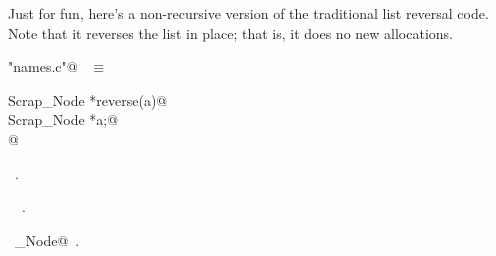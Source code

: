 \documentclass{report}
\begin{document}
Just for fun, here's a non-recursive version of the traditional list
reversal code. Note that it reverses the list in place; that is, it
does no new allocations.
\begin{flushleft} \small
\begin{minipage}{\linewidth} \label{scrap212}
\verb@"names.c"@\nobreak\ {\footnotesize {} }$\equiv$
\vspace{-1ex}
\begin{list}{}{} \item
\mbox{}\verb@static Scrap_Node *reverse(a)@\\
\mbox{}\verb@     Scrap_Node *a;@\\
\mbox{}@\\
\mbox{}\verb@@{\NWsep}
\end{list}
\vspace{-1ex}
\footnotesize\addtolength{\baselineskip}{-1ex}
\begin{list}{}{\setlength{\itemsep}{-\parsep}\setlength{\itemindent}{-\leftmargin}}
\item \NWtxtFileDefBy\ .
\end{list}
\vspace{-2ex}
\footnotesize\addtolength{\baselineskip}{-1ex}
\begin{list}{}{\setlength{\itemsep}{-\parsep}\setlength{\itemindent}{-\leftmargin}}
\item \NWtxtIdentsDefed\nobreak\  \verb@reverse@\nobreak\ .\end{list}
\vspace{-2ex}
\footnotesize\addtolength{\baselineskip}{-1ex}
\begin{list}{}{\setlength{\itemsep}{-\parsep}\setlength{\itemindent}{-\leftmargin}}
\item \NWtxtIdentsUsed\nobreak\  \verb@Scrap_Node@\nobreak\ .\end{list}
\end{minipage}\\[4ex]
\end{flushleft}
\end{document}
